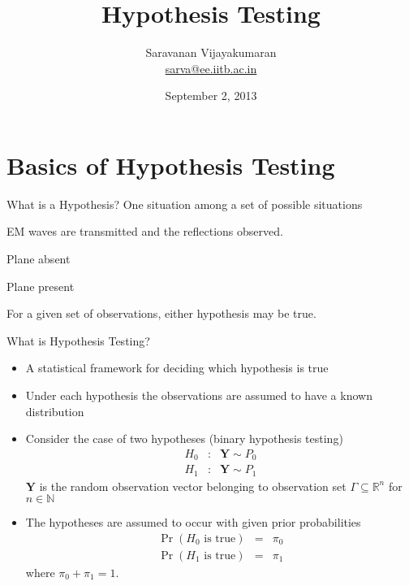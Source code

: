 \documentclass[t]{beamer}
\title[EE 703 DMT]{Hypothesis Testing}
\author[Saravanan V]
{
  Saravanan Vijayakumaran\\
  \href{mailto:sarva@ee.iitb.ac.in}{sarva@ee.iitb.ac.in}
}
\institute[IIT Bombay]
{
  Department of Electrical Engineering\\
  Indian Institute of Technology Bombay
}
\date{September 2, 2013}
\begin{document}
\begin{frame}
  \titlepage
\end{frame}

\section{Basics of Hypothesis Testing}
\begin{frame}{What is a Hypothesis?}
  \footnotesize
  \pause
  One situation among a set of possible situations
  \pause
  \begin{example}[Radar]
    EM waves are transmitted and the reflections observed.
      \begin{description}
        \pause
        \item[Null Hypothesis] Plane absent
        \pause
        \item[Alternative Hypothesis] Plane present
      \end{description}
  \end{example}
  \pause
  For a given set of observations, either hypothesis may be true.
  \normalsize
\end{frame}

\begin{frame}{What is Hypothesis Testing?}
  \footnotesize
  \begin{itemize}
    \pause
    \item A statistical framework for deciding which hypothesis is true
    \pause
    \item Under each hypothesis the observations are assumed to have a known distribution
    \pause
    \item Consider the case of two hypotheses (binary hypothesis testing)
    \begin{equation*}
      \begin{array}{lcl}
          H_0 & : & \mathbf{Y} \sim P_0 \\
          H_1 & : & \mathbf{Y} \sim P_1 
      \end{array}
    \end{equation*}
    \pause
    $\mathbf{Y}$ is the random observation vector belonging to observation set $\Gamma \subseteq \mathbb{R}^n$ for $n \in \mathbb{N}$
    \pause
    \item The hypotheses are assumed to occur with given prior probabilities
      \begin{eqnarray*}
        \Pr(H_0 \text{ is true}) & = & \pi_0 \\
        \Pr(H_1 \text{ is true}) & = & \pi_1 
      \end{eqnarray*}
      where $\pi_0+\pi_1 =1$.
  \end{itemize}
  \normalsize
\end{frame}
\end{document}
